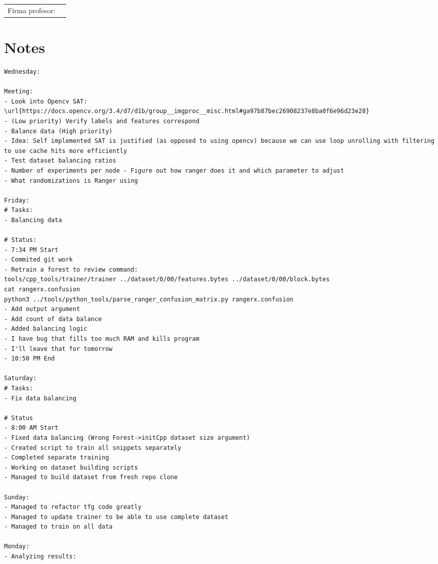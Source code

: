 \documentclass[12pt,oneside]{book}
\begin{document}
  \vfill

  \begin{tabular}{p{3 cm} p{10 cm}}
    Firma profesor: & \\
    \cline{2-2}
  \end{tabular}

  \newpage

  \section*{Notes}
  \setlength\parindent{0pt}

\begin{lstlisting}
Wednesday:

Meeting:
- Look into Opencv SAT: \url{https://docs.opencv.org/3.4/d7/d1b/group__imgproc__misc.html#ga97b87bec26908237e8ba0f6e96d23e28}
- (Low priority) Verify labels and features correspond
- Balance data (High priority)
- Idea: Self implemented SAT is justified (as opposed to using opencv) because we can use loop unrolling with filtering to use cache hits more efficiently
- Test dataset balancing ratios
- Number of experiments per node - Figure out how ranger does it and which parameter to adjust
- What randomizations is Ranger using

Friday:
# Tasks:
- Balancing data

# Status:
- 7:34 PM Start
- Commited git work
- Retrain a forest to review command:
tools/cpp_tools/trainer/trainer ../dataset/0/00/features.bytes ../dataset/0/00/block.bytes
cat rangerx.confusion
python3 ../tools/python_tools/parse_ranger_confusion_matrix.py rangerx.confusion
- Add output argument
- Add count of data balance
- Added balancing logic
- I have bug that fills too much RAM and kills program
- I'll leave that for tomorrow
- 10:50 PM End

Saturday:
# Tasks:
- Fix data balancing

# Status
- 8:00 AM Start
- Fixed data balancing (Wrong Forest->initCpp dataset size argument)
- Created script to train all snippets separately
- Completed separate training
- Working on dataset building scripts
- Managed to build dataset from fresh repo clone

Sunday:
- Managed to refactor tfg code greatly
- Managed to update trainer to be able to use complete dataset
- Managed to train on all data

Monday:
- Analyzing results:
\end{lstlisting}
\end{document}
